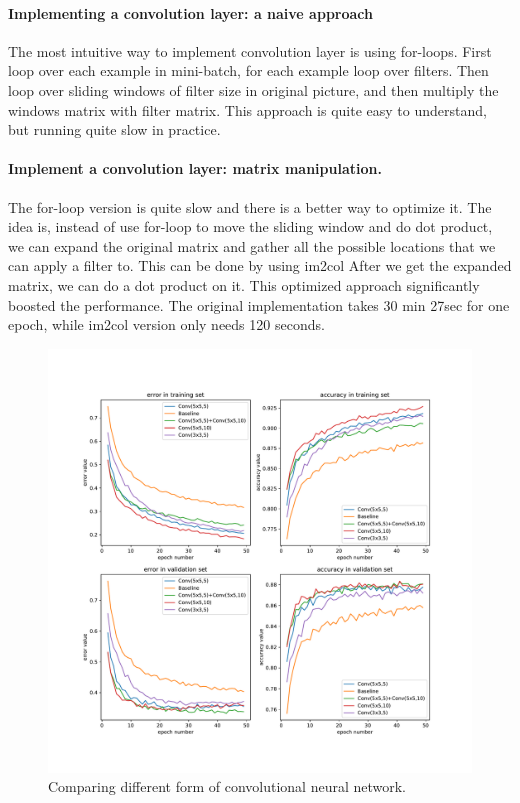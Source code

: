 \documentclass{article}
\begin{document}
\paragraph{Implementing a convolution layer: a naive approach }
The most intuitive way to implement convolution layer is using for-loops. First loop over each example in mini-batch, for each example loop over filters. Then loop over sliding windows of filter size in original picture, and then multiply the windows matrix with filter matrix. This approach is quite easy to understand, but running quite slow in practice.


\paragraph{Implement a convolution layer: matrix manipulation. }
The for-loop version is quite slow and there is a better way to optimize it. The idea is, instead of use for-loop to move the sliding window and do dot product, we can expand the original matrix and gather all the possible locations that we can apply a filter to. This can be done by using im2col \citep{im2col} After we get the expanded matrix, we can do a dot product on it. This optimized approach significantly boosted the performance. The original implementation takes 30 min 27sec for one epoch, while im2col version only needs 120 seconds.


\begin{figure}[tb]
\begin{center}
\centerline{\includegraphics[width=\columnwidth]{fig/cnn.pdf}}
\caption{Comparing different form of convolutional neural network.}
\label{fig:cnn}
\end{center}
\end{figure} 
\end{document}
